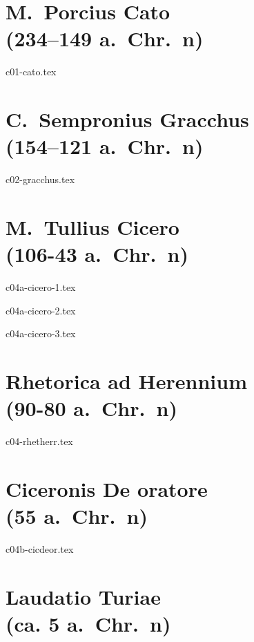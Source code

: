 \documentclass[a4paper,12pt,twoside]{report}
\begin{document}


\chapter[Cato]{M.\ Porcius Cato \\(234–149 a.~Chr.~n)}

{c01-cato.tex}

\chapter[C.\ Gracchus]{C.\ Sempronius Gracchus \\(154–121 a.~Chr.~n)}

{c02-gracchus.tex}

\chapter[Cicero]{M.\ Tullius Cicero \\(106-43 a.~Chr.~n)}

{c04a-cicero-1.tex}

{c04a-cicero-2.tex}

{c04a-cicero-3.tex}

\chapter[Rhetorica ad Herennium]{Rhetorica ad Herennium \\(90-80 a.~Chr.~n)}

{c04-rhetherr.tex}

\chapter[Ciceronis De oratore]{Ciceronis De oratore \\(55 a.~Chr.~n)}

{c04b-cicdeor.tex}

\chapter[Laudatio Turiae]{Laudatio Turiae \\(ca. 5 a.\ Chr.\ n)}
\end{document}
